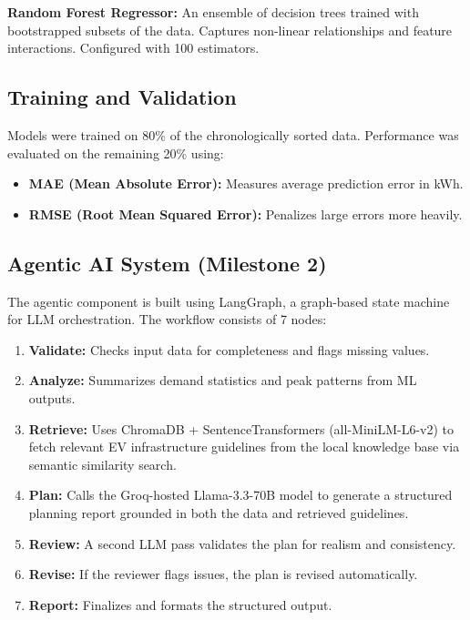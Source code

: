 \documentclass[conference]{IEEEtran}
\begin{document}
\textbf{Random Forest Regressor:} An ensemble of decision trees trained with bootstrapped subsets of the data. Captures non-linear relationships and feature interactions. Configured with 100 estimators.

\subsection{Training and Validation}

Models were trained on 80\% of the chronologically sorted data. Performance was evaluated on the remaining 20\% using:

\begin{itemize}
    \item \textbf{MAE (Mean Absolute Error):} Measures average prediction error in kWh.
    \item \textbf{RMSE (Root Mean Squared Error):} Penalizes large errors more heavily.
\end{itemize}

\subsection{Agentic AI System (Milestone 2)}

The agentic component is built using LangGraph, a graph-based state machine for LLM orchestration. The workflow consists of 7 nodes:

\begin{enumerate}
    \item \textbf{Validate:} Checks input data for completeness and flags missing values.
    \item \textbf{Analyze:} Summarizes demand statistics and peak patterns from ML outputs.
    \item \textbf{Retrieve:} Uses ChromaDB + SentenceTransformers (all-MiniLM-L6-v2) to fetch relevant EV infrastructure guidelines from the local knowledge base via semantic similarity search.
    \item \textbf{Plan:} Calls the Groq-hosted Llama-3.3-70B model to generate a structured planning report grounded in both the data and retrieved guidelines.
    \item \textbf{Review:} A second LLM pass validates the plan for realism and consistency.
    \item \textbf{Revise:} If the reviewer flags issues, the plan is revised automatically.
    \item \textbf{Report:} Finalizes and formats the structured output.
\end{enumerate}
\end{document}
